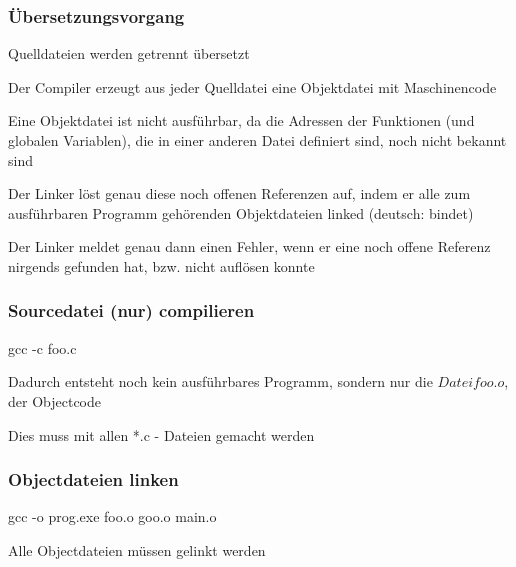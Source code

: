 			\subsubsection{Übersetzungsvorgang}	
				\begin{compactitem}
					\item Quelldateien werden getrennt übersetzt
					\item Der Compiler erzeugt aus jeder Quelldatei eine Objektdatei mit Maschinencode
					\item Eine Objektdatei ist nicht ausführbar, da die Adressen der Funktionen (und globalen Variablen), die in einer anderen Datei definiert sind, noch nicht bekannt sind
					\item Der Linker löst genau diese noch offenen Referenzen auf, indem er alle zum ausführbaren Programm gehörenden Objektdateien linked (deutsch: bindet)
					\item Der Linker meldet genau dann einen Fehler, wenn er eine noch offene Referenz nirgends gefunden hat, bzw. nicht auflösen konnte
				\end{compactitem}
			\begin{minipage}[t]{9 cm}
				\subsubsection{Sourcedatei (nur) compilieren}
					gcc -c foo.c\\
					\begin{compactitem}
						\item Dadurch entsteht noch kein ausführbares Programm, sondern nur die $Dateifoo.o$, der Objectcode
						\item Dies muss mit allen *.c - Dateien gemacht werden
					\end{compactitem}
			\end{minipage}
			\hspace*{0.5cm}
			\begin{minipage}[t]{9 cm}
				\subsubsection{Objectdateien linken}
					gcc  -o  prog.exe  foo.o  goo.o  main.o\\
					\begin{compactitem}
						\item Alle Objectdateien müssen gelinkt werden
					\end{compactitem}
			\end{minipage}\\\\
